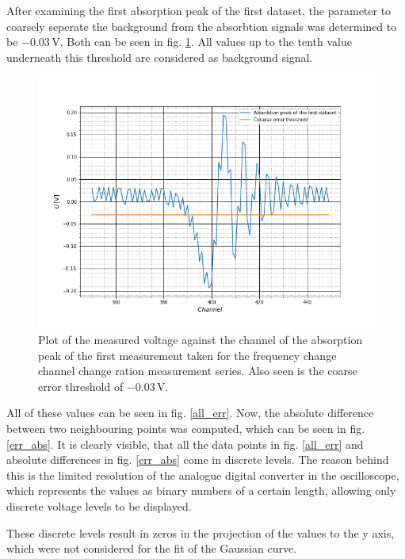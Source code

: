 After examining the first absorption peak of the first dataset, the parameter to coarsely seperate the background from the absorbtion signals was determined to be $-0.03\,$V. Both can be seen in fig. \ref{absorbtionpeak}. All values up to the tenth value underneath this threshold are considered as background signal.\par
\begin{figure}[h]
	\includegraphics[scale=0.5]{Bild/peak_first_single.png}
	\centering
	\caption[Plot of an absorption peak]{Plot of the measured voltage against the channel of the absorption peak of the first measurement taken for the frequency change channel change ration measurement series. Also seen is the coarse error threshold of $-0.03\,$V.}
	\label{absorbtionpeak}
\end{figure}

All of these values can be seen in fig. \ref{all_err}. Now, the absolute difference between two neighbouring points was computed, which can be seen in fig. \ref{err_abs}. It is clearly visible, that all the data points in fig. \ref{all_err} and absolute differences in fig. \ref{err_abs} come in discrete levels. The reason behind this is the limited resolution of the analogue digital converter in the oscilloscope, which represents the values as binary numbers of a certain length, allowing only discrete voltage levels to be displayed. \par
These discrete levels result in zeros in the projection of the values to the y axis, which were not considered for the fit of the Gaussian curve. 
